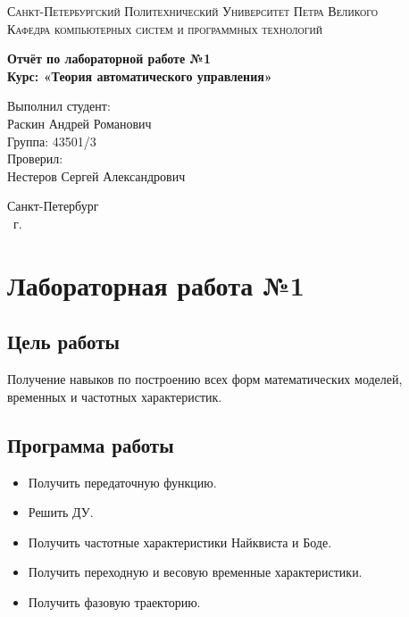 \documentclass[14pt,a4paper,report]{report}
\begin{document}
\def\contentsname{Содержание}

\begin{titlepage}
	\begin{center}
		\textsc{Санкт-Петербургский Политехнический 
			Университет Петра Великого\\[5mm]
			Кафедра компьютерных систем и программных технологий}
		
		\vfill
		
		\textbf{Отчёт по лабораторной работе №1\\[3mm]
			Курс: «Теория автоматического управления»\\[41mm]
			}
	\end{center}
	
	\hfill
	\begin{minipage}{.5\textwidth}
		Выполнил студент:\\[2mm] 
		Раскин Андрей Романович\\
		Группа: 43501/3\\[5mm]
		
		Проверил:\\[2mm] 
		Нестеров Сергей Александрович
	\end{minipage}
	\vfill
	\begin{center}
		Санкт-Петербург\\ \the\year\ г.
	\end{center}
\end{titlepage}

\tableofcontents
\clearpage

\chapter{Лабораторная работа №1}

\section{Цель работы}

Получение навыков по построению всех форм математических моделей, временных и частотных характеристик.

\section{Программа работы}

\begin{itemize}
	\item Получить передаточную функцию.
	\item Решить ДУ.
	\item Получить частотные характеристики Найквиста и Боде.
	\item Получить переходную и весовую временные характеристики.
	\item Получить фазовую траекторию.
\end{itemize}
\end{document}
